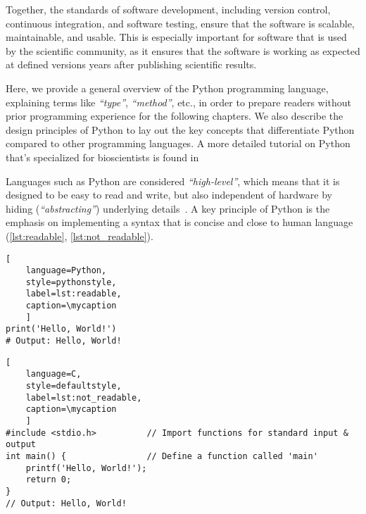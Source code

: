 Together, the standards of software development, including version control,
continuous integration, and software testing, ensure that the software is
scalable, maintainable, and usable. This is especially important for software
that is used by the scientific community, as it ensures that the software is
working as expected at defined versions years after publishing scientific
results.

%
\label{sec:python}%
Here, we provide a general overview of the Python programming language,
explaining terms like \textit{``type''}, \textit{``method''}, etc., in order to
prepare readers without prior programming experience for the following chapters.
We also describe the design principles of Python to lay out the key concepts
that differentiate Python compared to other programming languages. A more
detailed tutorial on Python that's specialized for bioscientists is found
in~\citealt{ekmekciIntroductionProgrammingBioscientists2016}


Languages such as Python are considered \textit{``high-level''}, which means
that it is designed to be easy to read and write, but also independent of
hardware by hiding (\textit{``abstracting''}) underlying
details~\cite{PythonLanguageReference2024}. A key principle of Python is the
emphasis on implementing a syntax that is concise and close to human language
(\autoref{lst:readable}, \autoref{lst:not_readable}).

\def\mycaption{ Example of
    readable Python code. This one-line code returns the words (string)
    \texttt{'Hello, World!'} when executed. The command is straightforward and easy
    to understand.}
\begin{lstlisting}[
    language=Python, 
    style=pythonstyle,
    label=lst:readable,
    caption=\mycaption
    ]
print('Hello, World!')
# Output: Hello, World!
\end{lstlisting}

\def\mycaption{ Example of less readable code written in the low-level
    programming language C. This code is doing exactly the same as the Python
    code in \autoref{lst:readable}, but is harder to understand because more
    steps are needed, including the import of a library \texttt{stdio.h} and the
    definition of a function called \texttt{main}.}
\begin{lstlisting}[
    language=C, 
    style=defaultstyle,
    label=lst:not_readable, 
    caption=\mycaption
    ]
#include <stdio.h>          // Import functions for standard input & output
int main() {                // Define a function called 'main'
    printf('Hello, World!');
    return 0;
}
// Output: Hello, World!
\end{lstlisting}

